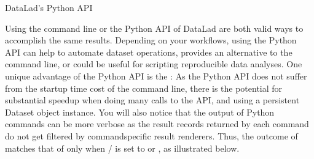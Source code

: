\begin{findoutmore}[label={fom-pythonapi}, before title={\thetcbcounter\ }, float, check odd page=true]{DataLad’s Python API}
\begin{sphinxVerbatim}[commandchars=\\\{\}]
    
  
 
\end{sphinxVerbatim}

\sphinxAtStartPar
{}

\sphinxAtStartPar
Using the command line or the Python API of DataLad are both valid ways to accomplish the same results.
Depending on your workflows, using the Python API can help to automate dataset operations, provides an alternative
to the command line, or could be useful for scripting reproducible data analyses.
One unique advantage of the Python API is the :
As the Python API does not suffer from the startup time cost of the command line,
there is the potential for substantial speed\sphinxhyphen{}up when doing many calls to the API,
and using a persistent Dataset object instance.
You will also notice that the output of Python commands can be more verbose as the result records returned by each command do not get filtered by command\sphinxhyphen{}specific result renderers.
Thus, the outcome of  matches that of  only when / is set to  or , as illustrated below.


\end{findoutmore}
